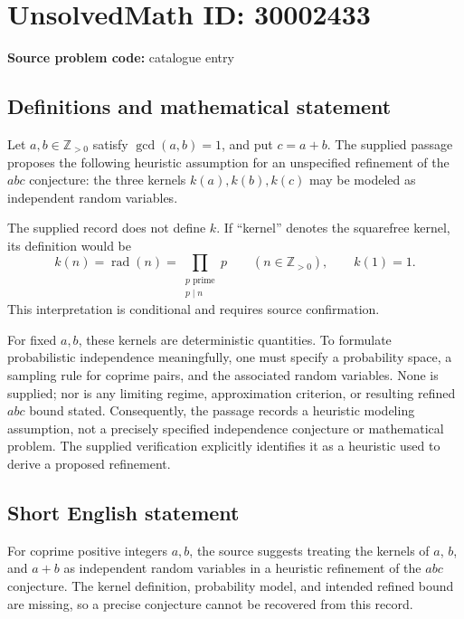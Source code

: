 \documentclass[11pt]{article}
\newcommand{\Z}{\mathbb{Z}}
\begin{document}
\section*{UnsolvedMath ID: 30002433}
\textbf{Source problem code:} catalogue entry
\subsection{Definitions and mathematical statement}
Let \(a,b\in\Z_{>0}\) satisfy \(\gcd(a,b)=1\), and put \(c=a+b\). The supplied passage proposes the following heuristic assumption for an unspecified refinement of the \(abc\) conjecture: the three kernels \(k(a),k(b),k(c)\) may be modeled as independent random variables.

The supplied record does not define \(k\). If ``kernel'' denotes the squarefree kernel, its definition would be
\[
 k(n)=\operatorname{rad}(n)=\prod_{\substack{p\text{ prime}\\p\mid n}}p
 \qquad(n\in\Z_{>0}),\qquad k(1)=1.
\]
This interpretation is conditional and requires source confirmation.

For fixed \(a,b\), these kernels are deterministic quantities. To formulate probabilistic independence meaningfully, one must specify a probability space, a sampling rule for coprime pairs, and the associated random variables. None is supplied; nor is any limiting regime, approximation criterion, or resulting refined \(abc\) bound stated. Consequently, the passage records a heuristic modeling assumption, not a precisely specified independence conjecture or mathematical problem. The supplied verification explicitly identifies it as a heuristic used to derive a proposed refinement.
\subsection{Short English statement}
For coprime positive integers \(a,b\), the source suggests treating the kernels of \(a\), \(b\), and \(a+b\) as independent random variables in a heuristic refinement of the \(abc\) conjecture. The kernel definition, probability model, and intended refined bound are missing, so a precise conjecture cannot be recovered from this record.
\end{document}
